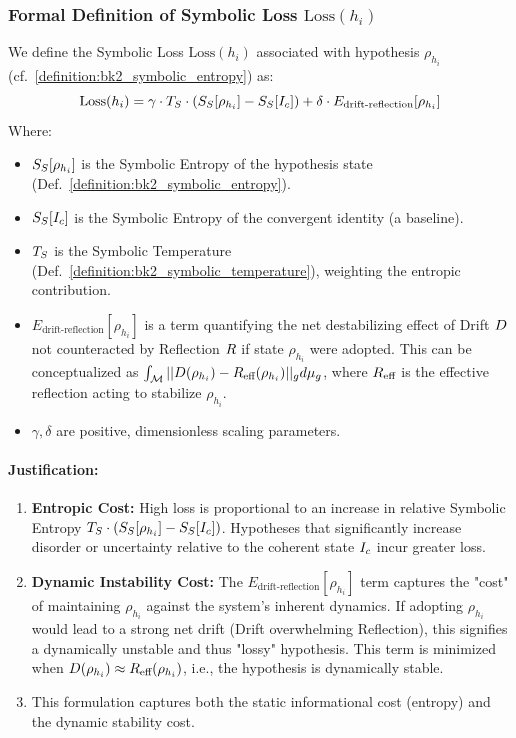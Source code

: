 \subsubsection{Formal Definition of Symbolic Loss \(\text{Loss}
\label{subsubsec:bk7_formal_definition_of_symbolic_loss_loss}(h_i)\)}
We define the Symbolic Loss \(\text{Loss}(h_i)\) associated with hypothesis \(\rho_{h_i}\) (cf.~\ref{definition:bk2_symbolic_entropy}) as:
\begin{equation}
\text{Loss}(h_i) = \gamma \cdot T_S \cdot (S_S[\rho_{h_i}] - S_S[I_c]) + \delta \cdot E_{\text{drift-reflection}}[\rho_{h_i}]
\label{eq:bk7_symbolic_loss}
\end{equation}
Where:
\begin{itemize}
    \item \(S_S[\rho_{h_i}]\) is the Symbolic Entropy of the hypothesis state (Def.~\ref{definition:bk2_symbolic_entropy}).
    \item \(S_S[I_c]\) is the Symbolic Entropy of the convergent identity (a baseline).
    \item \(T_S\) is the Symbolic Temperature (Def.~\ref{definition:bk2_symbolic_temperature}), weighting the entropic contribution.
    \item \(E_{\text{drift-reflection}}[\rho_{h_i}]\) is a term quantifying the net destabilizing effect of Drift \(D\) not counteracted by Reflection \(R\) if state \(\rho_{h_i}\) were adopted. This can be conceptualized as \(\int_{\mathcal{M}} ||D(\rho_{h_i}) - R_{\text{eff}}(\rho_{h_i})||_g d\mu_{g}\), where \(R_{\text{eff}}\) is the effective reflection acting to stabilize \(\rho_{h_i}\).
    \item \(\gamma, \delta\) are positive, dimensionless scaling parameters.
\end{itemize}
\paragraph{Justification:}
\begin{enumerate}
    \item \textbf{Entropic Cost:} High loss is proportional to an increase in relative Symbolic Entropy \(T_S \cdot (S_S[\rho_{h_i}] - S_S[I_c])\). Hypotheses that significantly increase disorder or uncertainty relative to the coherent state \(I_c\) incur greater loss.
    \item \textbf{Dynamic Instability Cost:} The \(E_{\text{drift-reflection}}[\rho_{h_i}]\) term captures the "cost" of maintaining \(\rho_{h_i}\) against the system's inherent dynamics. If adopting \(\rho_{h_i}\) would lead to a strong net drift (Drift overwhelming Reflection), this signifies a dynamically unstable and thus "lossy" hypothesis. This term is minimized when \(D(\rho_{h_i}) \approx R_{\text{eff}}(\rho_{h_i})\), i.e., the hypothesis is dynamically stable.
    \item This formulation captures both the static informational cost (entropy) and the dynamic stability cost.
\end{enumerate}
